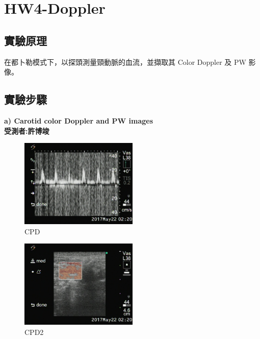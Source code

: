 \documentclass[12pts,a4paper]{article}
\begin{document}
\pagebreak
\section{HW4-Doppler}
\subsection{實驗原理}
在都卜勒模式下，以探頭測量頸動脈的血流，並擷取其 Color Doppler 及 PW 影像。
\subsection{實驗步驟}
\textbf{a) Carotid color Doppler and PW images} \\
\textbf{受測者:許博竣} \\
\begin{figure}[h]
    \centering
    \includegraphics[width=0.5\textwidth]{img_hw4/CPD.jpg}
    \caption{CPD}
    \label{fig:mesh1}
\end{figure}
\begin{figure}[h]
    \centering
    \includegraphics[width=0.5\textwidth]{img_hw4/CPD-2.jpg}
    \caption{CPD2}
    \label{fig:mesh1}
\end{figure}
\end{document}
